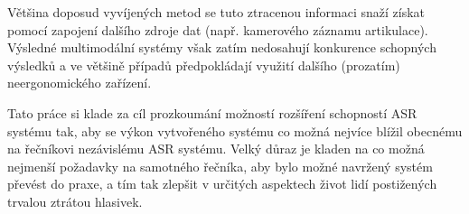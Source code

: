 Většina doposud vyvíjených metod se tuto ztracenou informaci snaží získat pomocí zapojení dalšího zdroje dat (např. kamerového záznamu artikulace). Výsledné multimodální systémy však zatím nedosahují konkurence schopných výsledků a ve většině případů předpokládají využití dalšího (prozatím) neergonomického zařízení.

Tato práce si klade za cíl prozkoumání možností rozšíření schopností ASR systému tak, aby se výkon vytvořeného systému co možná nejvíce blížil obecnému na řečníkovi nezávislému ASR systému. Velký důraz je kladen na co možná nejmenší požadavky na samotného řečníka, aby bylo možné navržený systém převést do praxe, a tím tak zlepšit v určitých aspektech život lidí postižených trvalou ztrátou hlasivek.


